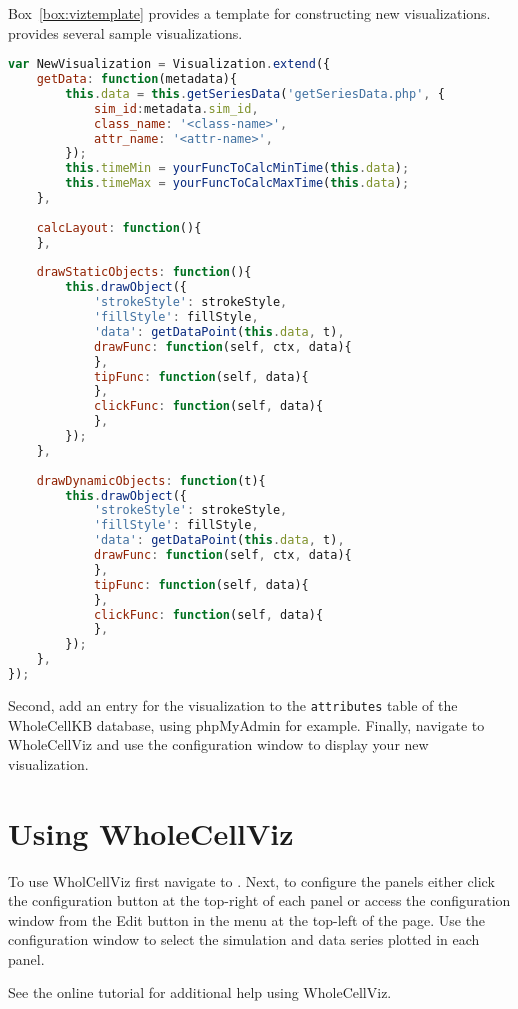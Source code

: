 \documentclass[twoside]{book}
\begin{document}
Box~\ref{box:viztemplate} provides a template for constructing new visualizations.  provides several sample visualizations.

\begin{lstlisting}[caption={\textbf{Visualization class template.}},label={box:viztemplate},language={JavaScript}]
var NewVisualization = Visualization.extend({
	getData: function(metadata){
		this.data = this.getSeriesData('getSeriesData.php', {
			sim_id:metadata.sim_id, 
			class_name: '<class-name>', 
			attr_name: '<attr-name>',
		});
		this.timeMin = yourFuncToCalcMinTime(this.data);
		this.timeMax = yourFuncToCalcMaxTime(this.data);
	},
	
	calcLayout: function(){
	},
	
	drawStaticObjects: function(){
		this.drawObject({
			'strokeStyle': strokeStyle,
			'fillStyle': fillStyle,
			'data': getDataPoint(this.data, t),
			drawFunc: function(self, ctx, data){
			},
			tipFunc: function(self, data){
			},
			clickFunc: function(self, data){
			},
		});
	},
	
	drawDynamicObjects: function(t){
		this.drawObject({
			'strokeStyle': strokeStyle,
			'fillStyle': fillStyle,
			'data': getDataPoint(this.data, t),
			drawFunc: function(self, ctx, data){
			},
			tipFunc: function(self, data){
			},
			clickFunc: function(self, data){
			},
		});
	},
});
\end{lstlisting}

Second, add an entry for the visualization to the \texttt{attributes} table of the WholeCellKB database, using phpMyAdmin for example. Finally, navigate to WholeCellViz and use the configuration window to display your new visualization.

\chapter{Using WholeCellViz}

To use WholCellViz first navigate to . Next, to configure the panels either click the configuration button at the top-right of each panel or access the configuration window from the Edit button in the menu at the top-left of the page. Use the configuration window to select the simulation and data series plotted in each panel. 

See the online tutorial for additional help using WholeCellViz.
\end{document}
